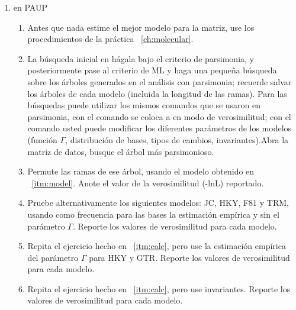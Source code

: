 \begin{enumerate} %
\item{en PAUP}
	\begin{enumerate} %
		\item \label{itm:model} Antes que nada estime el mejor modelo para la matriz, use los procedimientos de la pr\'actica ~\ref{ch:molecular}. 

		
		\item \label{itm:calc} La b\'usqueda inicial en  h\'agala bajo el criterio de parsimonia, y posteriormente pase al criterio de ML y haga una \textrm{peque\~na} b\'usqueda sobre los \'arboles generados en el an\'alisis con parsimonia; recuerde salvar los \'arboles de cada modelo (incluida la longitud de las ramas). Para las b\'usquedas puede utilizar los mismos comandos que se usaron en parsimonia, con el comando  se coloca a  en modo de verosimilitud; con el comando  usted puede modificar los diferentes par\'ametros de los modelos (funci\'on $\Gamma$, distribuci\'on de bases, tipos de cambios, invariantes).Abra la matriz de datos, busque el \'arbol m\'as parsimonioso.
		\item Permute las ramas de ese \'arbol, usando el modelo obtenido en ~\ref{itm:model}. Anote el valor de la verosimilitud (-lnL) reportado.
		\item  Pruebe alternativamente los siguientes modelos: JC, HKY, F81 y TRM, usando como frecuencia para las bases la estimaci\'on emp\'irica y sin el par\'ametro $\Gamma$. Reporte los valores de verosimilitud para cada modelo.



		\item Repita el ejercicio hecho en ~\ref{itm:calc}, pero use la estimaci\'on emp\'irica del par\'ametro $\Gamma$ para HKY y GTR. Reporte los valores de verosimilitud para cada modelo.
		
		\item Repita el ejercicio hecho en ~\ref{itm:calc}, pero use invariantes. Reporte los valores de verosimilitud para cada modelo.
	\end{enumerate}


\end{enumerate}
